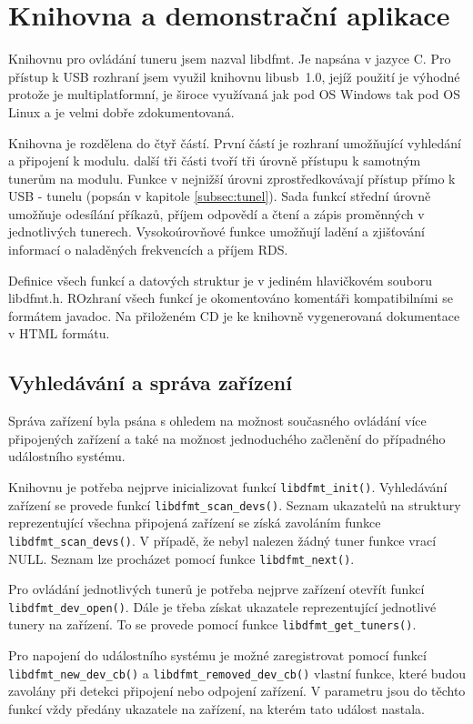 \section{Knihovna a demonstrační aplikace}
\label{sec:knihovna}

Knihovnu pro ovládání tuneru jsem nazval libdfmt. Je napsána v jazyce C. Pro přístup k USB rozhraní jsem využil knihovnu libusb~1.0, jejíž použití je výhodné protože je multiplatformní, je široce využívaná jak pod OS Windows tak pod OS Linux a je velmi dobře zdokumentovaná.

Knihovna je rozdělena do čtyř částí. První částí je rozhraní umožňující vyhledání a připojení k modulu. další tři části tvoří  tři úrovně přístupu k samotným tunerům na modulu. Funkce v nejnižší úrovni zprostředkovávají přístup přímo k USB - \iic tunelu (popsán v kapitole \ref{subsec:tunel}). Sada funkcí střední úrovně umožňuje odesílání příkazů, příjem odpovědí a čtení a zápis proměnných v jednotlivých tunerech. Vysokoúrovňové funkce umožňují ladění a zjišťování informací o naladěných frekvencích a příjem RDS.

Definice všech funkcí a datových struktur je v jediném hlavičkovém souboru libdfmt.h. ROzhraní všech funkcí je okomentováno komentáři kompatibilními se formátem javadoc. Na přiloženém CD je ke knihovně vygenerovaná dokumentace v HTML formátu.

\subsection{Vyhledávání a správa zařízení}

Správa zařízení byla psána s ohledem na možnost současného ovládání více připojených zařízení a také na možnost jednoduchého začlenění do případného událostního systému.

Knihovnu je potřeba nejprve inicializovat funkcí \verb|libdfmt_init()|. Vyhledávání zařízení se provede funkcí \verb|libdfmt_scan_devs()|. Seznam ukazatelů na struktury reprezentující všechna připojená zařízení se získá zavoláním funkce \verb|libdfmt_scan_devs()|. V případě, že nebyl nalezen žádný tuner funkce vrací NULL. Seznam lze procházet pomocí funkce \verb|libdfmt_next()|. 

Pro ovládání jednotlivých tunerů je potřeba nejprve zařízení otevřít funkcí \verb|libdfmt_dev_open()|. Dále je třeba získat ukazatele reprezentující jednotlivé tunery na zařízení. To se provede pomocí funkce \verb|libdfmt_get_tuners()|.

Pro napojení do událostního systému je možné zaregistrovat pomocí funkcí \verb|libdfmt_new_dev_cb()| a \verb|libdfmt_removed_dev_cb()| vlastní funkce, které budou zavolány při detekci připojení nebo odpojení zařízení. V parametru jsou do těchto funkcí vždy předány ukazatele na zařízení, na kterém tato událost nastala.

